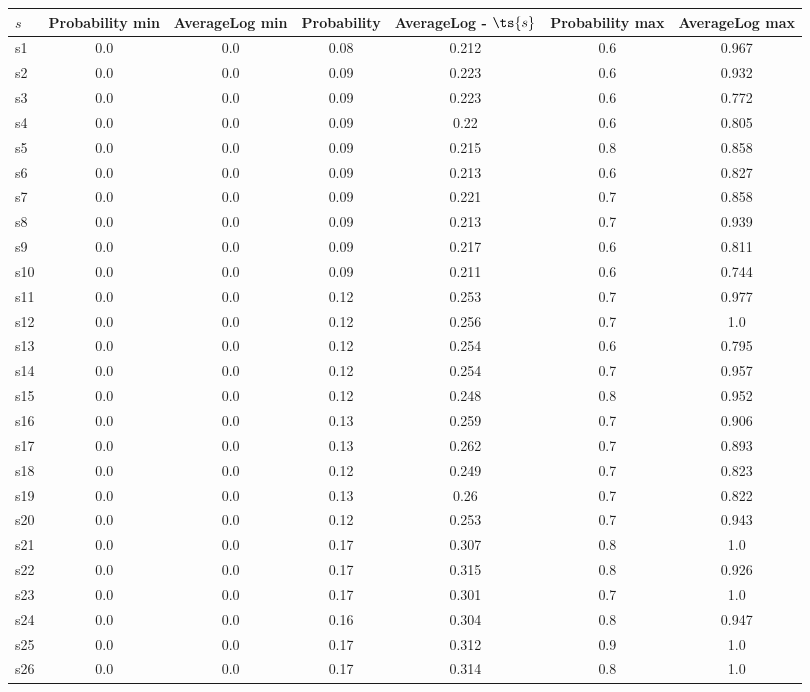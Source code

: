 \documentclass{article}
\begin{document}
\noindent\begin{tabular}{|l|c|c|c|c|c|c|}
\hline
$s$& Probability min & AverageLog min & Probability & AverageLog - $\ts{s}$ & Probability max & AverageLog max\\
\hline
s1 &0.0 & 0.0 & 0.08 & 0.212 & 0.6 & 0.967\\
\hline
s2 &0.0 & 0.0 & 0.09 & 0.223 & 0.6 & 0.932\\
\hline
s3 &0.0 & 0.0 & 0.09 & 0.223 & 0.6 & 0.772\\
\hline
s4 &0.0 & 0.0 & 0.09 & 0.22 & 0.6 & 0.805\\
\hline
s5 &0.0 & 0.0 & 0.09 & 0.215 & 0.8 & 0.858\\
\hline
s6 &0.0 & 0.0 & 0.09 & 0.213 & 0.6 & 0.827\\
\hline
s7 &0.0 & 0.0 & 0.09 & 0.221 & 0.7 & 0.858\\
\hline
s8 &0.0 & 0.0 & 0.09 & 0.213 & 0.7 & 0.939\\
\hline
s9 &0.0 & 0.0 & 0.09 & 0.217 & 0.6 & 0.811\\
\hline
s10 &0.0 & 0.0 & 0.09 & 0.211 & 0.6 & 0.744\\
\hline
s11 &0.0 & 0.0 & 0.12 & 0.253 & 0.7 & 0.977\\
\hline
s12 &0.0 & 0.0 & 0.12 & 0.256 & 0.7 & 1.0\\
\hline
s13 &0.0 & 0.0 & 0.12 & 0.254 & 0.6 & 0.795\\
\hline
s14 &0.0 & 0.0 & 0.12 & 0.254 & 0.7 & 0.957\\
\hline
s15 &0.0 & 0.0 & 0.12 & 0.248 & 0.8 & 0.952\\
\hline
s16 &0.0 & 0.0 & 0.13 & 0.259 & 0.7 & 0.906\\
\hline
s17 &0.0 & 0.0 & 0.13 & 0.262 & 0.7 & 0.893\\
\hline
s18 &0.0 & 0.0 & 0.12 & 0.249 & 0.7 & 0.823\\
\hline
s19 &0.0 & 0.0 & 0.13 & 0.26 & 0.7 & 0.822\\
\hline
s20 &0.0 & 0.0 & 0.12 & 0.253 & 0.7 & 0.943\\
\hline
s21 &0.0 & 0.0 & 0.17 & 0.307 & 0.8 & 1.0\\
\hline
s22 &0.0 & 0.0 & 0.17 & 0.315 & 0.8 & 0.926\\
\hline
s23 &0.0 & 0.0 & 0.17 & 0.301 & 0.7 & 1.0\\
\hline
s24 &0.0 & 0.0 & 0.16 & 0.304 & 0.8 & 0.947\\
\hline
s25 &0.0 & 0.0 & 0.17 & 0.312 & 0.9 & 1.0\\
\hline
s26 &0.0 & 0.0 & 0.17 & 0.314 & 0.8 & 1.0\\

\end{tabular}
\end{document}
